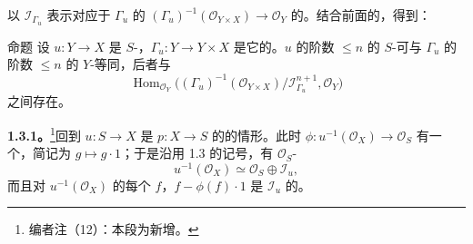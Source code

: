 以 $\mathcal I_{\Gamma_u}$ 表示对应于 $\Gamma_u$ 的 $(\Gamma_u)^{-1}(\mathcal O_{Y\times X})\to\mathcal O_Y$ 的。结合前面的，得到：
\begin{SGAresult}{命题}{}
设 $u:Y\to X$ 是 $S$-，$\Gamma_u:Y\to Y\times X$ 是它的。$u$ 的阶数 $\leq n$ 的 $S$-可与 $\Gamma_u$ 的阶数 $\leq n$ 的 $Y$-等同，后者与
\[
\operatorname{Hom}_{\mathcal O_Y}\bigl((\Gamma_u)^{-1}(\mathcal O_{Y\times X})/\mathcal I_{\Gamma_u}^{n+1},\mathcal O_Y\bigr)
\]
之间存在。
\end{SGAresult}
\textbf{1.3.1。}\footnote{编者注（12）：本段为新增。}回到 $u:S\to X$ 是 $p:X\to S$ 的的情形。此时 $\phi:u^{-1}(\mathcal O_X)\to\mathcal O_S$ 有一个，简记为 $g\mapsto g\cdot1$；于是沿用 1.3 的记号，有 $\mathcal O_S$-
\[
u^{-1}(\mathcal O_X)\simeq\mathcal O_S\oplus\mathcal I_u,\tag{$\star$}
\]
而且对 $u^{-1}(\mathcal O_X)$ 的每个 $f$，$f-\phi(f)\cdot1$ 是 $\mathcal I_u$ 的。

